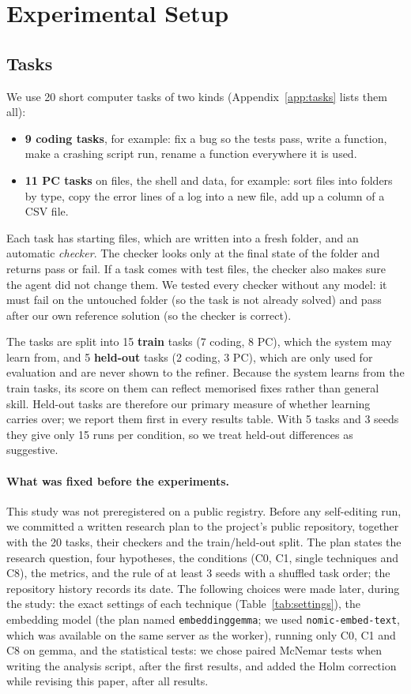 \section{Experimental Setup}
\label{sec:setup}

\subsection{Tasks}
We use 20 short computer tasks of two kinds (Appendix~\ref{app:tasks} lists them all):
\begin{itemize}
  \item \textbf{9 coding tasks}, for example: fix a bug so the tests pass, write a function, make a
        crashing script run, rename a function everywhere it is used.
  \item \textbf{11 PC tasks} on files, the shell and data, for example: sort files into folders by
        type, copy the error lines of a log into a new file, add up a column of a CSV file.
\end{itemize}
Each task has starting files, which are written into a fresh folder, and an automatic
\emph{checker}. The checker looks only at the final state of the folder and returns pass or fail.
If a task comes with test files, the checker also makes sure the agent did not change them. We
tested every checker without any model: it must fail on the untouched folder (so the task is not
already solved) and pass after our own reference solution (so the checker is correct).

The tasks are split into 15 \textbf{train} tasks (7 coding, 8 PC), which the system may learn from,
and 5 \textbf{held-out} tasks (2 coding, 3 PC), which are only used for evaluation and are never
shown to the refiner. Because the system learns from the train tasks, its score on them can reflect memorised
fixes rather than general skill. Held-out tasks are therefore our primary measure of whether
learning carries over; we report them first in every results table. With 5 tasks and 3 seeds they
give only 15 runs per condition, so we treat held-out differences as suggestive.

\paragraph{What was fixed before the experiments.}
This study was not preregistered on a public registry. Before any self-editing run, we committed a
written research plan to the project's public repository, together with the 20 tasks, their
checkers and the train/held-out split. The plan states the research question, four hypotheses, the
conditions (C0, C1, single techniques and C8), the metrics, and the rule of at least 3 seeds with a
shuffled task order; the repository history records its date. The following choices were made
later, during the study: the exact settings of each technique (Table~\ref{tab:settings}), the
embedding model (the plan named \texttt{embeddinggemma}; we used \texttt{nomic-embed-text}, which
was available on the same server as the worker), running only C0, C1 and C8 on gemma, and the
statistical tests: we chose paired McNemar tests when writing the analysis script, after the first
results, and added the Holm correction while revising this paper, after all results.

